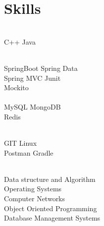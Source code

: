 \documentclass[]{deedy-resume-openfont}
\begin{document}
\begin{minipage}[t]{0.33\textwidth}

\section{Skills}
\\
\textbullet{} C++ \textbullet{} Java 
   
   

\\
 \textbullet{} SpringBoot 
  \textbullet{} Spring Data \\
 \textbullet{} Spring MVC
 \textbullet{} Junit\\
 \textbullet{} Mockito \\
 


\\
 \textbullet{} MySQL 
\textbullet{} MongoDB \\
\textbullet{} Redis



\\
\textbullet{} GIT \textbullet{}Linux \\
\textbullet{}Postman \textbullet{} Gradle


\sectionsep


\\

\textbullet{}Data structure and Algorithm  \\
\textbullet{}Operating Systems\\
\textbullet{}Computer Networks\\
\textbullet{}Object Oriented Programming\\
\textbullet{}Database Management Systems \\



\end{minipage}
\end{document}

